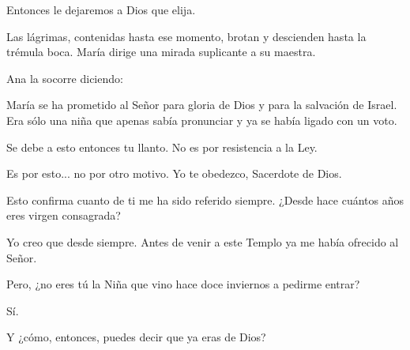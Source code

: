 \documentclass[12pt]{book} %
\begin{document}
Entonces le dejaremos a Dios que elija. 

Las lágrimas, contenidas hasta ese momento, brotan y descienden hasta la trémula boca. María dirige una mirada suplicante a su maestra. 

Ana la socorre diciendo: 

María se ha prometido al Señor para gloria de Dios y para la salvación de Israel. Era sólo una niña que apenas sabía pronunciar y ya se había ligado con un voto. 

Se debe a esto entonces tu llanto. No es por resistencia a la Ley. 

Es por esto... no por otro motivo. Yo te obedezco, Sacerdote de Dios. 

Esto confirma cuanto de ti me ha sido referido siempre. ¿Desde hace cuántos años eres virgen consagrada? 

Yo creo que desde siempre. Antes de venir a este Templo ya me había ofrecido al Señor. 

Pero, ¿no eres tú la Niña que vino hace doce inviernos a pedirme entrar? 

Sí. 

Y ¿cómo, entonces, puedes decir que ya eras de Dios? 
\end{document}
